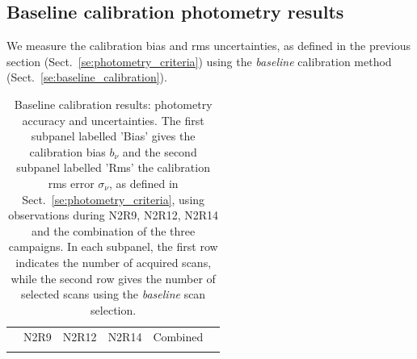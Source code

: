 \subsection{Baseline calibration photometry results}
\label{se:photometry_baseline}

We measure the calibration bias and rms uncertainties, as defined
in the previous section (Sect.~\ref{se:photometry_criteria}) using the
\emph{baseline} calibration method (Sect.~\ref{se:baseline_calibration}).

\begin{table}[!thbp]
  \begin{center}
    \caption[Baseline calibration results]{Baseline calibration results:
  photometry accuracy and uncertainties. The first subpanel labelled 'Bias' gives the
  calibration bias $b_{\nu}$ and the second subpanel labelled 'Rms' the calibration
  rms error $\sigma_{\nu}$, as defined in
  Sect.~\ref{se:photometry_criteria},
  using observations during N2R9, N2R12, N2R14 and the combination of
  the three campaigns. {\lp In each subpanel, the first row indicates the
    number of acquired scans, while the second row gives the
    number of selected scans using the \emph{baseline} scan selection.}}
\label{tab:baseline-photometry}
\begin{tabular}{clrrrr}
  \hline\hline
  \noalign{\smallskip}
  \multicolumn{2}{c}{Characteristics} &  N2R9  & N2R12   &  N2R14 & Combined \\
  \noalign{\smallskip}
  \hline
  \noalign{\smallskip}

\end{tabular}
\end{center}
\end{table}
